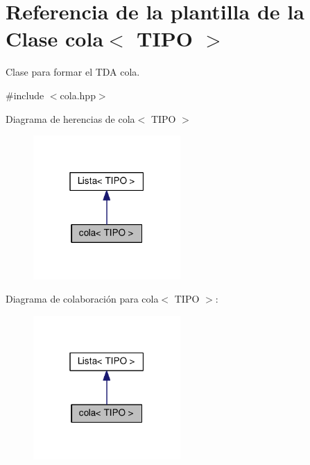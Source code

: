 \hypertarget{classcola}{}\section{Referencia de la plantilla de la Clase cola$<$ T\+I\+PO $>$}
\label{classcola}


Clase para formar el T\+DA cola.  




{\ttfamily \#include $<$cola.\+hpp$>$}



Diagrama de herencias de cola$<$ T\+I\+PO $>$\nopagebreak
\begin{figure}[H]
\begin{center}
\leavevmode
\includegraphics[width=159pt]{classcola__inherit__graph}
\end{center}
\end{figure}


Diagrama de colaboración para cola$<$ T\+I\+PO $>$\+:\nopagebreak
\begin{figure}[H]
\begin{center}
\leavevmode
\includegraphics[width=159pt]{classcola__coll__graph}
\end{center}
\end{figure}
